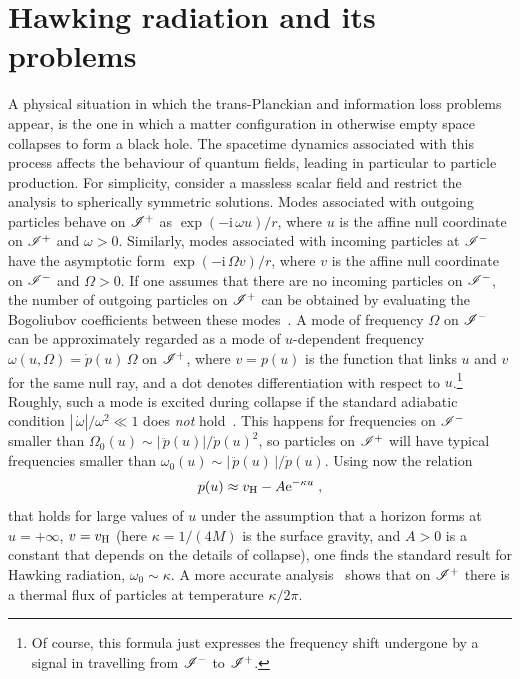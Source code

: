 \documentclass[groupedaddress, showpacs, showkeys, onecolumn, nofootinbib, 12pt]{revtex4}
\begin{document}
\section{Hawking radiation and its problems}
\label{sec:problems}

A physical situation in which the trans-Planckian and information loss problems appear, is the one in which a matter configuration in otherwise empty space collapses to form a black hole.  The spacetime dynamics associated with this process affects the behaviour of quantum fields, leading in particular to particle production.  For simplicity, consider a massless scalar field and restrict the analysis to spherically symmetric solutions.  Modes associated with outgoing particles behave  on $\mathscr{I}^+$ as $\exp\left(-\mathrm{i}\,\omega u\right)/r$, where $u$ is the affine null coordinate on $\mathscr{I}^{+}$ and $\omega>0$.  Similarly, modes associated with incoming particles at $\mathscr{I}^-$ have the asymptotic form $\exp\left(-\mathrm{i}\,\Omega v\right)/r$, where $v$ is the affine null coordinate on $\mathscr{I}^{-}$ and $\Omega>0$.  If one assumes that there are no incoming particles on $\mathscr{I}^-$, the number of outgoing particles on $\mathscr{I}^+$ can be obtained by evaluating the Bogoliubov coefficients between these modes~\cite{Hawking:1974sw, Birrell:1982ix, Novikov:1989sz}.  A mode of frequency $\Omega$ on $\mathscr{I}^-$ can be approximately regarded as a mode of $u$-dependent frequency $\omega(u,\Omega) = \dot{p}(u)\,\Omega $ on $\mathscr{I}^+$, where $v=p(u)$ is the function that links  $u$ and $v$ for the same null ray, and a dot denotes differentiation with respect to $u$.\footnote{Of course, this formula just expresses the frequency shift undergone by a signal in travelling from $\mathscr{I}^-$ to $\mathscr{I}^+$.}  Roughly, such a mode is excited during collapse if the standard adiabatic condition $|\,\dot{\omega}|/\omega^2\ll 1$ does \emph{not\/} hold~\cite{Barcelo:2007yk}.  This happens for frequencies on $\mathscr{I}^-$ smaller than $\Omega_0(u) \sim |\,\ddot{p}(u)|/\dot{p}(u)^2$, so particles on $\mathscr{I}^+$ will have typical frequencies smaller than $\omega_0(u)\sim |\,\ddot{p}(u)\,|/\dot{p}(u)$.  Using now the relation 
%
\begin{eqnarray}
p(u)\approx v_{\rm H} - A{\mathrm e}^{-\kappa u}\;,
\label{standard-p}
\end{eqnarray}
%
that holds for large values of $u$ under the assumption that a horizon forms at $u=+\infty$, $v=v_{\rm H}$ (here $\kappa=1/(4M)$ is the surface gravity, and $A>0$ is a constant that depends on the details of collapse), one finds the standard result for Hawking radiation, $\omega_0\sim \kappa$.  A more accurate analysis~\cite{Hawking:1974sw, Birrell:1982ix, Novikov:1989sz} shows that on $\mathscr{I}^+$ there is a thermal flux of particles at temperature $\kappa/2\pi$.
\end{document}
